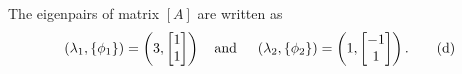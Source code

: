 \documentclass{AeroStructure-ERJohnson}
\begin{document}
{\def\thefigure{18.5}
}

\pagebreak

The eigenpairs of matrix $[A]$ are written as
\begin{align}\label{18.4d}
\left(\lambda_{1},\left\{\phi_{1}\right\}\right)=\left(3,\left[\begin{array}{@{}l@{}}1 \\1\end{array}\right]\right) \quad \text{and } \quad\left(\lambda_{2},\left\{\phi_{2}\right\}\right)=\left(1,\left[\begin{array}{@{}c@{}}-1 \\1\end{array}\right]\right).\tag{d}
\end{align}

\vspace*{-1pc}
\end{document}
